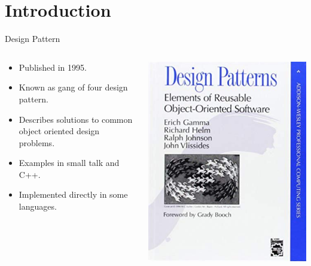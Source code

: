 \documentclass[13pt]{beamer}
\begin{document}
\section{Introduction}
\begin{frame}{Design Pattern}

\begin{columns}[T]
\begin{column}{.5\textwidth}                                          
	\begin{itemize}
		\setlength\itemsep{1em}
		\item Published in 1995.
		\item Known as gang of four design pattern.
		\item Describes solutions to common object oriented design problems.
		\item Examples in small talk and C++.
		\item Implemented directly in some languages.
	\end{itemize}
\end{column}

\begin{column}{.5\textwidth}                                              
	\includegraphics[scale=0.3]{gangoffour.png}
\end{column}%
\end{columns}
\end{frame}
\end{document}
